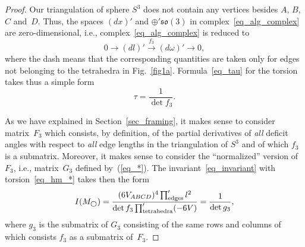 \documentclass[pdftex]{sigma}
\begin{document}
\begin{proof}
Our triangulation of sphere $S^3$ does not contain any vertices besides $A$, $B$, $C$ and~$D$. Thus, the spaces $(dx)'$ and $\oplus' \mathfrak{so}(3)$ in complex~\eqref{eq_alg_complex} are zero-dimen\-sional, i.e., complex~\eqref{eq_alg_complex} is reduced to \begin{equation}
0\xrightarrow{} (dl)' \xrightarrow{f_3} (d\omega)' \xrightarrow{} 0,
\label{eq_alg_compl-copy}
\end{equation}
where the dash means that the corresponding quantities are taken only for edges not belonging to the tetrahedra in Fig.~\ref{fig1a}. Formula~\eqref{eq_tau} for the torsion takes thus a simple form
\begin{equation}
\tau = \frac{1}{\det f_3}.
\label{eq_hm_*}
\end{equation}

As we have explained in Section~\ref{sec_framing}, it makes sense to consider matrix~$F_3$ which consists, by def\/inition, of the partial derivatives of \emph{all} def\/icit angles with respect to \emph{all} edge lengths in the triangulation of $S^3$ and of which $f_3$ is a submatrix. Moreover, it makes sense to consider the ``normalized'' version of~$F_3$, i.e., matrix~$G_3$ def\/ined by~(\ref{eq_*}). The invariant~\eqref{eq_invariant} with torsion~\eqref{eq_hm_*} takes then the form
\begin{equation}
I(M_{\bigcirc}) = \frac{(6V_{ABCD})^4 \prod_{\rm edges}' l^2}{\det f_3 \prod_{\rm tetrahedra}' (-6V)} = \frac{1}{\det g_3},
\label{eq_inv0-copy}
\end{equation}
where $g_3$ is the submatrix of $G_3$ consisting of the same rows and columns of which consists $f_3$ as a submatrix of~$F_3$.


\end{proof}
\end{document}

